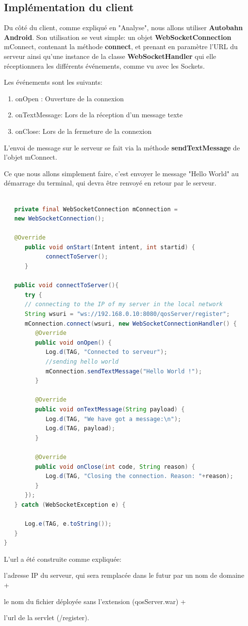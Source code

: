 \subsection{Implémentation du client}
Du côté du client, comme expliqué en "Analyse", nous allons utiliser \textbf{Autobahn Android}. Son utilisation se veut simple: un objet \textbf{WebSocketConnection} mConnect, contenant la méthode \textbf{connect}, et prenant en paramètre l'URL du serveur ainsi qu'une instance de la classe \textbf{WebSocketHandler} qui elle réceptionnera les différents événements, comme vu avec les Sockets.

\medskip

Les événements sont les suivants:

\begin{enumerate}
	\item onOpen : Ouverture de la connexion
	\item onTextMessage: Lors de la réception d'un message texte
	\item onClose: Lors de la fermeture de la connexion
\end{enumerate}

L'envoi de message sur le serveur se fait via la méthode \textbf{sendTextMessage} de l'objet mConnect.

\medskip

Ce que nous allons simplement faire, c'est envoyer le message "Hello World" au démarrage du terminal, qui devra être renvoyé en retour par le serveur.

\begin{lstlisting}[language=Java, caption={Envoi Hello World Android vers Serveur via WebSockets}]

   private final WebSocketConnection mConnection = 
   new WebSocketConnection();

   @Override
      public void onStart(Intent intent, int startid) {
            connectToServer();
      }
      
   public void connectToServer(){
      try {
      // connecting to the IP of my server in the local network
      String wsuri = "ws://192.168.0.10:8080/qosServer/register";
      mConnection.connect(wsuri, new WebSocketConnectionHandler() {
         @Override
         public void onOpen() {
            Log.d(TAG, "Connected to serveur");
            //sending hello world
            mConnection.sendTextMessage("Hello World !");
         }

         @Override
         public void onTextMessage(String payload) {
            Log.d(TAG, "We have got a message:\n");
            Log.d(TAG, payload);
         }

         @Override
         public void onClose(int code, String reason) {
            Log.d(TAG, "Closing the connection. Reason: "+reason);
         }
      });
   } catch (WebSocketException e) {

      Log.e(TAG, e.toString());
   }
}
\end{lstlisting}

\medskip

L'url a été construite comme expliquée: 

l'adresse IP du serveur, qui sera remplacée dans le futur par un nom de domaine + 

le nom du fichier déployée sans l'extension (qosServer.war) + 

l'url de la servlet (/register).